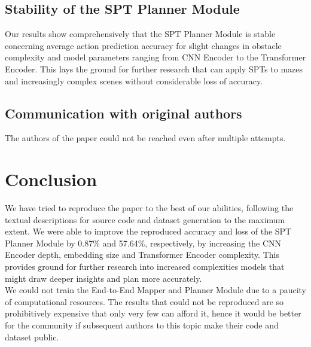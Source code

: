 \subsection{Stability of the SPT Planner Module}
Our results show comprehensively that the SPT Planner Module is stable concerning average action prediction accuracy for slight changes in obstacle complexity and model parameters ranging from CNN Encoder to the Transformer Encoder. This lays the ground for further research that can apply SPTs to mazes and increasingly complex scenes without considerable loss of accuracy.

\vspace{-5pt}
\subsection{Communication with original authors}
The authors of the paper could not be reached even after multiple attempts.
\vspace{-5pt}
\section{Conclusion}
We have tried to reproduce the paper to the best of our abilities, following the textual descriptions for source code and dataset generation to the maximum extent. We were able to improve the reproduced accuracy and loss of the SPT Planner Module by 0.87\% and 57.64\%, respectively, by increasing the CNN Encoder depth, embedding size and Transformer Encoder complexity. This provides ground for further research into increased complexities models that might draw deeper insights and plan more accurately. \\ 
We could not train the End-to-End Mapper and Planner Module due to a paucity of computational resources. The results that could not be reproduced are so prohibitively expensive that only very few can afford it, hence it would be better for the community if subsequent authors to this topic make their code and dataset public.
